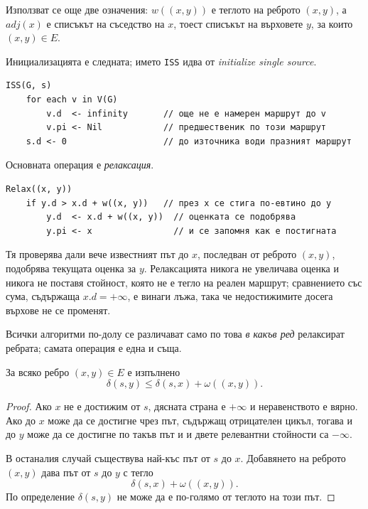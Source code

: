 Използват се още две означения: $w((x,y))$ е теглото на реброто $(x,y)$, а $\mathit{adj}(x)$ е списъкът на съседство на $x$, тоест списъкът на върховете $y$, за които $(x,y)\in E$.

Инициализацията е следната; името \verb|ISS| идва от \emph{initialize single source}.

\begin{verbatim}
ISS(G, s)
    for each v in V(G)
        v.d  <- infinity       // още не е намерен маршрут до v
        v.pi <- Nil            // предшественик по този маршрут
    s.d <- 0                   // до източника води празният маршрут
\end{verbatim}

Основната операция е \emph{релаксация}.

\begin{verbatim}
Relax((x, y))
    if y.d > x.d + w((x, y))   // през x се стига по-евтино до y
        y.d  <- x.d + w((x, y))  // оценката се подобрява
        y.pi <- x                // и се запомня как е постигната
\end{verbatim}

Тя проверява дали вече известният път до $x$, последван от реброто $(x,y)$, подобрява текущата оценка за $y$. Релаксацията никога не увеличава оценка и никога не поставя стойност, която не е тегло на реален маршрут; сравнението със сума, съдържаща $x.d=+\infty$, е винаги лъжа, така че недостижимите досега върхове не се променят.

Всички алгоритми по-долу се различават само по това \emph{в какъв ред} релаксират ребрата; самата операция е една и съща.

\begin{lem}
За всяко ребро $(x,y)\in E$ е изпълнено
\[
\delta(s,y)\leq \delta(s,x)+\omega((x,y)).
\]
\end{lem}

\begin{proof}
Ако $x$ не е достижим от $s$, дясната страна е $+\infty$ и неравенството е вярно. Ако до $x$ може да се достигне чрез път, съдържащ отрицателен цикъл, тогава и до $y$ може да се достигне по такъв път и и двете релевантни стойности са $-\infty$.

В останалия случай съществува най-къс път от $s$ до $x$. Добавянето на реброто $(x,y)$ дава път от $s$ до $y$ с тегло
\[
\delta(s,x)+\omega((x,y)).
\]
По определение $\delta(s,y)$ не може да е по-голямо от теглото на този път.
\end{proof}

